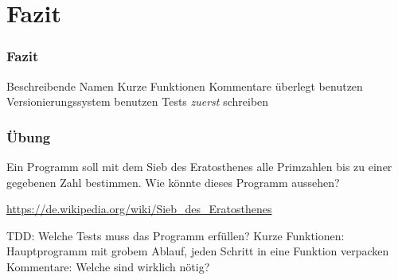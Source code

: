 \documentclass{beamer}
\begin{document}
\section{Fazit}
\begin{frame}
    \begin{tikzpicture}[overlay,
        shift={(current page.south west)},
        x = \paperwidth,
        y = \paperheight,
    ]
\end{tikzpicture}
    \frametitle{Fazit}
    \begin{outline}
        \1 Beschreibende Namen
        \1 Kurze Funktionen
        \1 Kommentare überlegt benutzen
        \1 Versionierungssystem benutzen
        \1 Tests \emph{zuerst} schreiben
    \end{outline}
    \pause
\end{frame}

\begin{frame}
    \frametitle{Übung}
    Ein Programm soll mit dem Sieb des Eratosthenes alle Primzahlen bis zu
    einer gegebenen Zahl bestimmen. Wie könnte dieses Programm aussehen?

    \vspace{1em}\url{https://de.wikipedia.org/wiki/Sieb_des_Eratosthenes}

    \vspace{1em}\pause
    \begin{outline}
        \1 TDD: Welche Tests muss das Programm erfüllen?
        \1 Kurze Funktionen: Hauptprogramm mit grobem Ablauf, jeden Schritt in
        eine Funktion verpacken
        \1 Kommentare: Welche sind wirklich nötig?
    \end{outline}
\end{frame}
\end{document}
